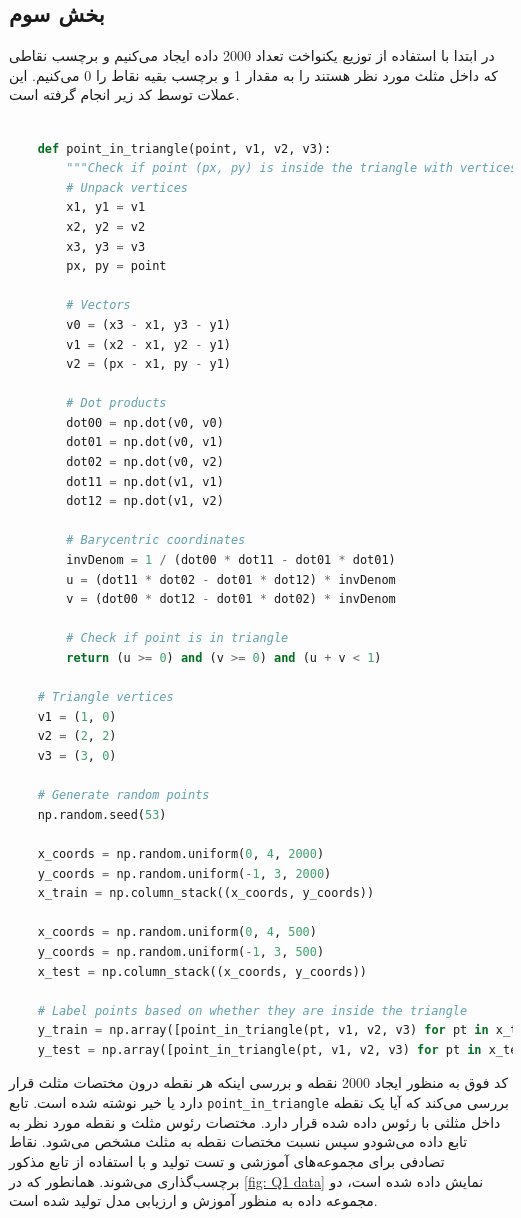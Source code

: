 \documentclass{article}
\begin{document}
	\subsection{بخش سوم}
	در ابتدا با استفاده از توزیع یکنواخت تعداد 2000 داده ایجاد می‌کنیم و برچسب نقاطی که داخل مثلث مورد نظر هستند را به مقدار 1 و برچسب بقیه نقاط را 0 می‌کنیم. این عملات توسط کد زیر انجام گرفته است.
	\begin{LTR}
	\begin{lstlisting}[language=Python, caption=data generation]

	def point_in_triangle(point, v1, v2, v3):
		"""Check if point (px, py) is inside the triangle with vertices v1, v2, v3."""
		# Unpack vertices
		x1, y1 = v1
		x2, y2 = v2
		x3, y3 = v3
		px, py = point
		
		# Vectors
		v0 = (x3 - x1, y3 - y1)
		v1 = (x2 - x1, y2 - y1)
		v2 = (px - x1, py - y1)
		
		# Dot products
		dot00 = np.dot(v0, v0)
		dot01 = np.dot(v0, v1)
		dot02 = np.dot(v0, v2)
		dot11 = np.dot(v1, v1)
		dot12 = np.dot(v1, v2)
		
		# Barycentric coordinates
		invDenom = 1 / (dot00 * dot11 - dot01 * dot01)
		u = (dot11 * dot02 - dot01 * dot12) * invDenom
		v = (dot00 * dot12 - dot01 * dot02) * invDenom
		
		# Check if point is in triangle
		return (u >= 0) and (v >= 0) and (u + v < 1)
		
	# Triangle vertices
	v1 = (1, 0)
	v2 = (2, 2)
	v3 = (3, 0)
		
	# Generate random points
	np.random.seed(53)
		
	x_coords = np.random.uniform(0, 4, 2000)
	y_coords = np.random.uniform(-1, 3, 2000)
	x_train = np.column_stack((x_coords, y_coords))
		
	x_coords = np.random.uniform(0, 4, 500)
	y_coords = np.random.uniform(-1, 3, 500)
	x_test = np.column_stack((x_coords, y_coords))
		
	# Label points based on whether they are inside the triangle
	y_train = np.array([point_in_triangle(pt, v1, v2, v3) for pt in x_train]).astype(int)
	y_test = np.array([point_in_triangle(pt, v1, v2, v3) for pt in x_test]).astype(int)

	\end{lstlisting}
	\end{LTR}
کد فوق به منظور ایجاد 2000 نقطه و بررسی اینکه هر نقطه درون مختصات مثلث قرار دارد یا خیر نوشته شده است. تابع
 \texttt{point\_in\_triangle}
  بررسی می‌کند که آیا یک نقطه داخل مثلثی با رئوس داده شده قرار دارد. مختصات رئوس مثلث و نقطه مورد نظر به تابع داده می‌شودو سپس نسبت مختصات نقطه به مثلث مشخص می‌شود. نقاط تصادفی برای مجموعه‌های آموزشی و تست تولید و با استفاده از تابع مذکور برچسب‌گذاری می‌شوند. همانطور که در 
  \autoref{fig: Q1 data}
  نمایش داده شده است، دو مجموعه داده به منظور آموزش و ارزیابی مدل تولید شده است.
  
\end{document}
